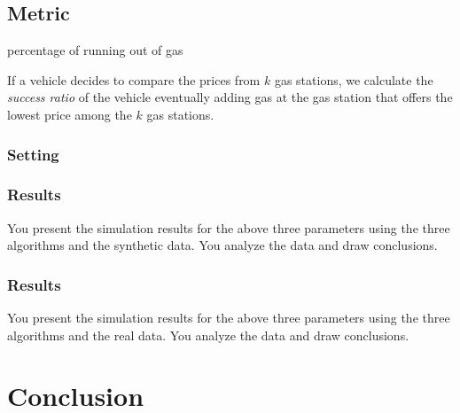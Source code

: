 \documentclass[conference]{IEEEtran}
\theoremstyle{definition}
\begin{document}
\subsection{Metric}
{\color{red} percentage of running out of gas}

If a vehicle decides to compare the prices from $k$ gas stations, we calculate the {\em success ratio} of the vehicle eventually adding gas at the gas station that offers the lowest price among the $k$ gas stations.

\subsubsection{Setting}

\subsubsection{Results}
You present the simulation results for the above three parameters using the three algorithms and the synthetic data. You analyze the data and draw conclusions. 

\subsubsection{Results}
{\color{red} You present the simulation results for the above three parameters using the three algorithms and the real data. You analyze the data and draw conclusions.}

\section{Conclusion} \label{conclusion}



\end{document}
